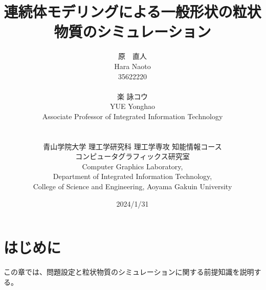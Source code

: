 \documentclass[12pt]{ltjsarticle}
\begin{document}
\title{\Huge{連続体モデリングによる一般形状の粒状物質のシミュレーション}}
\author{ 原　直人\\
 Hara Naoto\\
 35622220
 \\\\
楽 詠コウ \\
YUE Yonghao \\
Associate Professor of Integrated Information Technology \\
\\\\
青山学院大学 理工学研究科 理工学専攻 知能情報コース\\
コンピュータグラフィックス研究室\\
Computer Graphics Laboratory,\\
Department of Integrated Information Technology,\\
College of Science and Engineering, Aoyama Gakuin University}
\date{2024/1/31}

\maketitle

\thispagestyle{empty}
\newpage

\tableofcontents
\clearpage

\listoffigures

\clearpage


\section{はじめに}
この章では、問題設定と粒状物質のシミュレーションに関する前提知識を説明する。
\end{document}
